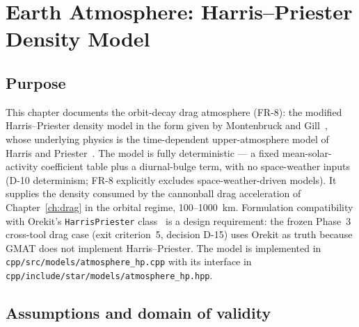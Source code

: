 \chapter{Earth Atmosphere: Harris--Priester Density Model}
\label{ch:harrispriester}

\section{Purpose}
\label{sec:hp:purpose}

This chapter documents the orbit-decay drag atmosphere (FR-8): the modified
Harris--Priester density model in the form given by Montenbruck and
Gill~\cite[Sect.~3.5.2]{montenbruck2000}, whose underlying physics is the
time-dependent upper-atmosphere model of Harris and
Priester~\cite{harris1962}. The model is fully deterministic --- a fixed
mean-solar-activity coefficient table plus a diurnal-bulge term, with no
space-weather inputs (D-10 determinism; FR-8 explicitly excludes
space-weather-driven models). It supplies the density consumed by the
cannonball drag acceleration of Chapter~\ref{ch:drag} in the orbital
regime, 100--1000~km. Formulation compatibility with Orekit's
\texttt{HarrisPriester} class~\cite{orekithp} is a design requirement: the
frozen Phase~3 cross-tool drag case (exit criterion~5, decision D-15) uses
Orekit as truth because GMAT does not implement Harris--Priester. The model
is implemented in \texttt{cpp/src/models/atmosphere\_hp.cpp} with its
interface in \texttt{cpp/include/star/models/atmosphere\_hp.hpp}.

\section{Assumptions and domain of validity}
\label{sec:hp:domain}

